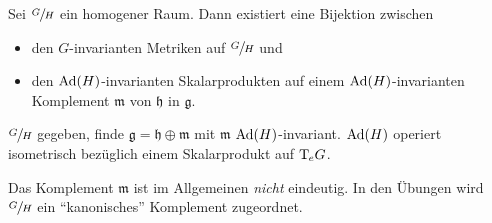 \begin{korollar}[{name=[Bijektion zw. Metriken auf Quotient und $\Ad(H)$-inv. Skalarprodukten auf Komplement]},label=kor:3113]
	Sei $\sfrac{G}{H}$ ein homogener Raum.
	Dann existiert eine Bijektion zwischen
	\begin{itemize}
		\item den $G$-invarianten Metriken auf $\sfrac{G}{H}$ und
		\item den $\Ad(H)$-invarianten Skalarprodukten auf einem $\Ad(H)$-invarianten Komplement $\mathfrak{m}$ von $\mathfrak{h}$ in $\mathfrak{g}$.
	\end{itemize}
\end{korollar}
\begin{beweis}[Rezept]
	$\sfrac{G}{H}$ gegeben, finde $\mathfrak{g} = \mathfrak{h} \oplus \mathfrak{m}$ mit $\mathfrak{m}$ $\Ad(H)$-invariant.
	$\Ad(H)$ operiert isometrisch bezüglich einem Skalarprodukt auf $\mathrm{T}\mkern-0.85mu_e G$.
\end{beweis}

\begin{bemerkung*}[{name=[Eindeutigkeit des Komplements]}]
	Das Komplement $\mathfrak{m}$ ist im Allgemeinen \emph{nicht} eindeutig.
	In den Übungen wird $\sfrac{G}{H}$ ein \enquote{kanonisches} Komplement zugeordnet.
\end{bemerkung*}

